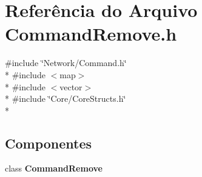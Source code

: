 \section{Referência do Arquivo Command\+Remove.\+h}
\label{_command_remove_8h}
{\ttfamily \#include \char`\"{}Network/\+Command.\+h\char`\"{}}\\*
{\ttfamily \#include $<$map$>$}\\*
{\ttfamily \#include $<$vector$>$}\\*
{\ttfamily \#include \char`\"{}Core/\+Core\+Structs.\+h\char`\"{}}\\*
\subsection*{Componentes}
\begin{DoxyCompactItemize}
\item 
class {\bf Command\+Remove}
\end{DoxyCompactItemize}
